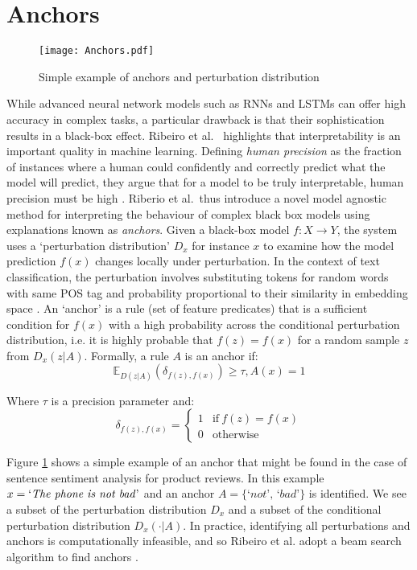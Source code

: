 \documentclass[Dissertation.tex]{subfiles}
\begin{document}
\section{Anchors}\label{sec:anchors}

\begin{figure}
	\centering
	\texttt{[image: Anchors.pdf]}
	\caption{Simple example of anchors and perturbation distribution}
	\label{fig:Anchors}
\end{figure}
While advanced neural network models such as RNNs and LSTMs can offer high accuracy in complex tasks, a particular drawback is that their sophistication results in a black-box effect. Ribeiro et al.\ \cite{ribeiroAnchorsHighPrecision} highlights that interpretability is an important quality in machine learning. Defining \textit{human precision} as the fraction of instances where a human could confidently and correctly predict what the model will predict, they argue that for a model to be truly interpretable, human precision must be high \cite{ribeiroAnchorsHighPrecision}. Riberio et al.\ thus introduce a novel model agnostic method for interpreting the behaviour of complex black box models using explanations known as \textit{anchors}. Given a black-box model $ f: X \rightarrow Y $, the system uses a `perturbation distribution' $ D_x $ for instance $ x$ to examine how the model prediction $ f(x) $ changes locally under perturbation. In the context of text classification, the perturbation involves substituting tokens for random words with same POS tag and probability proportional to their similarity in embedding space \cite{ribeiroAnchorsHighPrecision}. An `anchor' is a rule (set of feature predicates) that is a sufficient condition for $ f(x) $ with a high probability across the conditional perturbation distribution, i.e. it is highly probable that $f(z)=f(x)  $ for a random sample $ z $ from $ D_x(z|A) $. Formally, a rule $ A $ is an anchor if:
\[ \mathbb{E}_{D(z|A)}(\delta_{f(z),f(x)}) \geq \tau, A(x)=1 \]

Where $ \tau $ is a precision parameter and: \[  \delta_{f(z),f(x)} =\begin{cases}
1 & \text{if}\ f(z)=f(x)\\
0 &  \text{otherwise}
\end{cases} 	\]

Figure \ref{fig:Anchors} shows a simple example of an anchor that might be found in the case of sentence sentiment analysis for product reviews. In this example $ x = \text{`\textit{The phone is not bad}'} $ and an anchor $ A=\{\textit{`not', `bad'}\} $ is identified. We see a subset of the perturbation distribution $ D_x $ and a subset of the conditional perturbation distribution $ D_x(\cdot|A) $. In practice, identifying all perturbations and anchors is computationally infeasible, and so Ribeiro et al. adopt a beam search algorithm to find anchors \cite{ribeiroAnchorsHighPrecision}.
\end{document}
